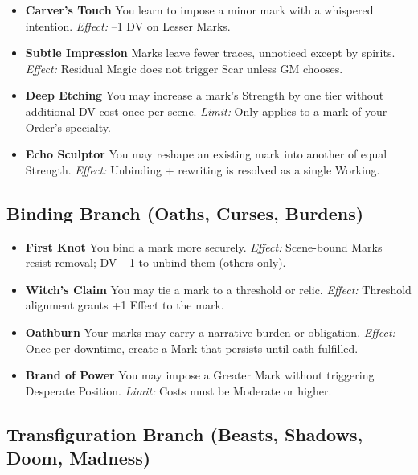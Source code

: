 \documentclass[11pt]{book}
\begin{document}
\begin{itemize}[leftmargin=2em]
    \item \textbf{Carver's Touch}  
    You learn to impose a minor mark with a whispered intention.  
    \emph{Effect:} --1 DV on Lesser Marks.

    \item \textbf{Subtle Impression}  
    Marks leave fewer traces, unnoticed except by spirits.  
    \emph{Effect:} Residual Magic does not trigger Scar unless GM chooses.

    \item \textbf{Deep Etching}  
    You may increase a mark's Strength by one tier without additional DV cost once per scene.  
    \emph{Limit:} Only applies to a mark of your Order's specialty.

    \item \textbf{Echo Sculptor}  
    You may reshape an existing mark into another of equal Strength.  
    \emph{Effect:} Unbinding + rewriting is resolved as a single Working.
\end{itemize}

\subsection*{Binding Branch (Oaths, Curses, Burdens)}

\begin{itemize}[leftmargin=2em]
    \item \textbf{First Knot}  
    You bind a mark more securely.  
    \emph{Effect:} Scene-bound Marks resist removal; DV +1 to unbind them (others only).

    \item \textbf{Witch's Claim}  
    You may tie a mark to a threshold or relic.  
    \emph{Effect:} Threshold alignment grants +1 Effect to the mark.

    \item \textbf{Oathburn}  
    Your marks may carry a narrative burden or obligation.  
    \emph{Effect:} Once per downtime, create a Mark that persists until oath-fulfilled.

    \item \textbf{Brand of Power}  
    You may impose a Greater Mark without triggering Desperate Position.  
    \emph{Limit:} Costs must be Moderate or higher.
\end{itemize}

\subsection*{Transfiguration Branch (Beasts, Shadows, Doom, Madness)}
\end{document}

